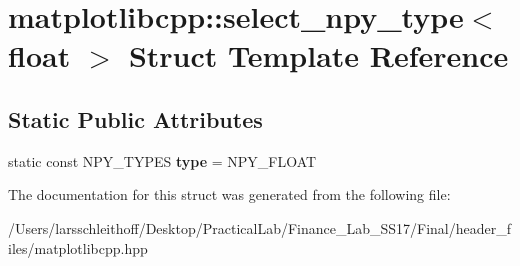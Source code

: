 \hypertarget{structmatplotlibcpp_1_1select__npy__type_3_01float_01_4}{}\section{matplotlibcpp\+:\+:select\+\_\+npy\+\_\+type$<$ float $>$ Struct Template Reference}
\label{structmatplotlibcpp_1_1select__npy__type_3_01float_01_4}
\subsection*{Static Public Attributes}
\begin{DoxyCompactItemize}
\item 
\mbox{\label{structmatplotlibcpp_1_1select__npy__type_3_01float_01_4_a7bca025a3f0cb143e566e0f575bf7f6b}} 
static const N\+P\+Y\+\_\+\+T\+Y\+P\+ES {\bfseries type} = N\+P\+Y\+\_\+\+F\+L\+O\+AT
\end{DoxyCompactItemize}


The documentation for this struct was generated from the following file\+:\begin{DoxyCompactItemize}
\item 
/\+Users/larsschleithoff/\+Desktop/\+Practical\+Lab/\+Finance\+\_\+\+Lab\+\_\+\+S\+S17/\+Final/header\+\_\+files/matplotlibcpp.\+hpp\end{DoxyCompactItemize}
